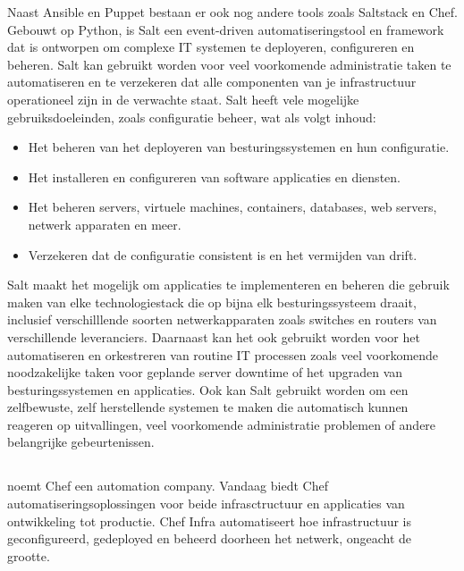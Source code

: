 Naast Ansible en Puppet bestaan er ook nog andere tools zoals Saltstack en Chef.
Gebouwt op Python, is Salt een event-driven automatiseringstool en framework dat is ontworpen om complexe IT systemen te deployeren, configureren en beheren. Salt kan gebruikt worden voor veel voorkomende administratie taken te automatiseren en te verzekeren dat alle componenten van je infrastructuur operationeel zijn in de verwachte staat.
Salt heeft vele mogelijke gebruiksdoeleinden, zoals configuratie beheer, wat als volgt inhoud:
\begin{itemize}
  \item Het beheren van het deployeren van besturingssystemen en hun configuratie.
  \item Het installeren en configureren van software applicaties en diensten.
  \item Het beheren servers, virtuele machines, containers, databases, web servers, netwerk apparaten en meer.
  \item Verzekeren dat de configuratie consistent is en het vermijden van drift.
\end{itemize}

Salt maakt het mogelijk om applicaties te implementeren en beheren die gebruik maken van elke technologiestack die op bijna elk besturingssysteem draait, inclusief verschilllende soorten netwerkapparaten zoals switches en routers van verschillende leveranciers.
Daarnaast kan het ook gebruikt worden voor het automatiseren en orkestreren van routine IT processen zoals veel voorkomende noodzakelijke taken voor geplande server downtime of het upgraden van besturingssystemen en applicaties. 
Ook kan Salt gebruikt worden om een zelfbewuste, zelf herstellende systemen te maken die automatisch kunnen reageren op uitvallingen, veel voorkomende administratie problemen of andere belangrijke gebeurtenissen. \autocite{Saltstack} \\

\subsection{}
\label{subsec:Chef}

\textcite{Chef} noemt Chef een automation company. Vandaag biedt Chef automatiseringsoplossingen voor beide infrasctructuur en applicaties van ontwikkeling tot productie.
Chef Infra automatiseert hoe infrastructuur is geconfigureerd, gedeployed en beheerd doorheen het netwerk, ongeacht de grootte. \\


